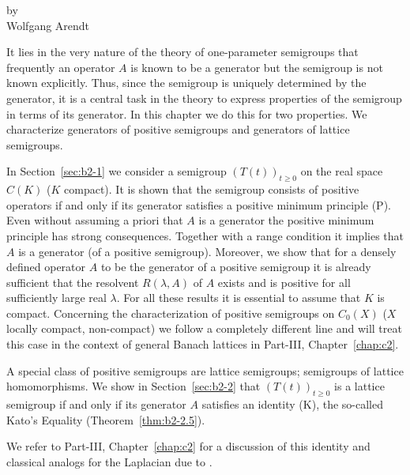 \setcounter{section}{0}
\label{chap:b2}%
\thispagestyle{empty}
{\Large
\vspace*{-.75cm}
by \\[.25em]
Wolfgang Arendt 
\vspace{.75cm}
\\
}

It lies in the very nature of the theory of one-parameter semigroups that frequently an operator $A$ is known to be a generator but the semigroup is not known explicitly.
Thus, since the semigroup is uniquely determined by the generator, it is a central task in the theory to express properties of the semigroup in terms of its generator.
In this chapter we do this for two properties.
We characterize generators of positive semigroups and generators of lattice semigroups.

In Section~\ref{sec:b2-1} we consider a semigroup $(T(t))_{t \geq 0}$ on the real space $C(K)$ ($K$ compact).
It is shown that the semigroup consists of positive operators if and only if its generator satisfies a positive minimum principle (P).
Even without assuming a priori that $A$ is a generator the positive minimum principle has strong consequences.
Together with a range condition it implies that $A$ is a generator (of a positive semigroup).
Moreover, we show that for a densely defined operator $A$ to be the generator of a positive semigroup it is already sufficient that the resolvent $R(\lambda,A)$ of\/ $A$ exists and is positive for all sufficiently large real $\lambda$.
For all these results it is essential to assume that $K$ is compact.
Concerning the characterization of positive semigroups on $C_{0}(X)$ ($X$ locally compact, non-compact) we follow a completely different line and will treat this case in the context of general Banach lattices in Part-III, Chapter~\ref{chap:c2}.

A special class of positive semigroups are lattice semigroups; \ie  semigroups of lattice homomorphisms.
We show in Section~\ref{sec:b2-2} that $(T(t))_{t \geq 0}$ is a lattice semigroup if and only if its generator $A$ satisfies an identity (K), the so-called Kato's Equality (Theorem~\ref{thm:b2-2.5}).

We refer to Part-III, Chapter~\ref{chap:c2} for a discussion of this identity and classical analogs for the Laplacian due to \textcite{kato:1973}.

